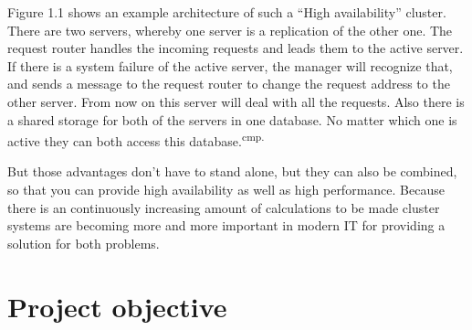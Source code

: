 Figure 1.1 shows an example architecture of such a ``High availability'' cluster. There are two servers, whereby one server is a replication of the other one. The request router handles the incoming requests and leads them to the active server. If there is a system failure of the active server, the manager will recognize that, and sends a message to the request router to change the request address to the other server. From now on this server will deal with all the requests. Also there is a shared storage for both of the servers in one database. No matter which one is active they can both access this database.\textsuperscript{cmp.\cite{4}}


But those advantages don't have to stand alone, but they can also be combined, so that you can provide high availability as well as high performance. Because there is an continuously increasing amount of calculations to be made cluster systems are becoming more and more important in modern IT for providing a solution for both problems.

\section{Project objective}

